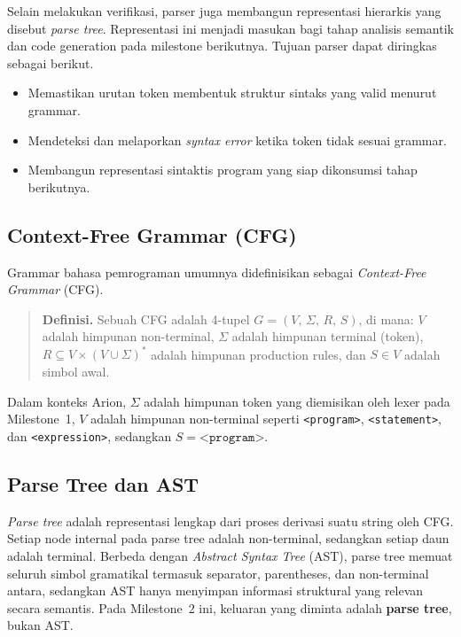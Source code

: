 \documentclass[11pt,a4paper]{article}
\begin{document}
Selain melakukan verifikasi, parser juga membangun representasi hierarkis yang
disebut \textit{parse tree}. Representasi ini menjadi masukan bagi tahap analisis
semantik dan code generation pada milestone berikutnya.
Tujuan parser dapat diringkas sebagai berikut.

\begin{itemize}
    \item Memastikan urutan token membentuk struktur sintaks yang valid menurut grammar.
    \item Mendeteksi dan melaporkan \textit{syntax error} ketika token tidak sesuai grammar.
    \item Membangun representasi sintaktis program yang siap dikonsumsi tahap berikutnya.
\end{itemize}

\subsection{Context-Free Grammar (CFG)}

Grammar bahasa pemrograman umumnya didefinisikan sebagai \textit{Context-Free Grammar} (CFG).

\begin{quote}
\textbf{Definisi.}
Sebuah CFG adalah 4-tupel $G = (V,\, \Sigma,\, R,\, S)$, di mana:
$V$ adalah himpunan non-terminal,
$\Sigma$ adalah himpunan terminal (token),
$R \subseteq V \times (V \cup \Sigma)^{*}$ adalah himpunan production rules,
dan $S \in V$ adalah simbol awal.
\end{quote}

Dalam konteks Arion, $\Sigma$ adalah himpunan token yang diemisikan oleh lexer
pada Milestone~1, $V$ adalah himpunan non-terminal seperti \texttt{<program>},
\texttt{<statement>}, dan \texttt{<expression>}, sedangkan $S = \texttt{<program>}$.

\subsection{Parse Tree dan AST}

\textit{Parse tree} adalah representasi lengkap dari proses derivasi suatu string
oleh CFG. Setiap node internal pada parse tree adalah non-terminal, sedangkan
setiap daun adalah terminal. Berbeda dengan \textit{Abstract Syntax Tree} (AST),
parse tree memuat seluruh simbol gramatikal termasuk separator, parentheses, dan
non-terminal antara, sedangkan AST hanya menyimpan informasi struktural yang
relevan secara semantis. Pada Milestone~2 ini, keluaran yang diminta adalah
\textbf{parse tree}, bukan AST.
\end{document}
